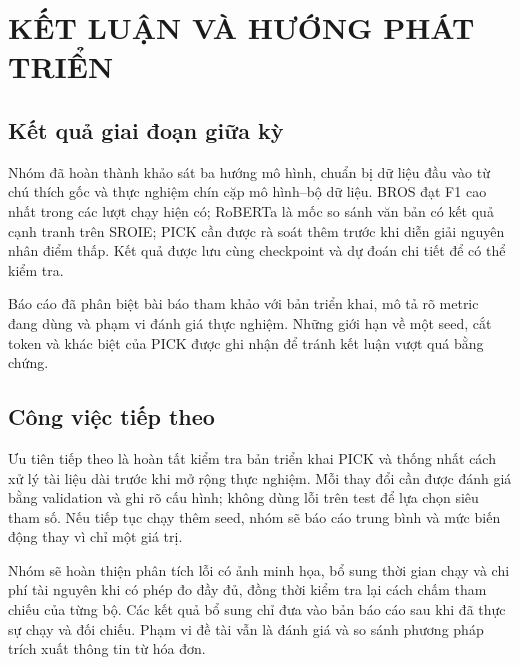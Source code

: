 \chapter{KẾT LUẬN VÀ HƯỚNG PHÁT TRIỂN}

\section{Kết quả giai đoạn giữa kỳ}

Nhóm đã hoàn thành khảo sát ba hướng mô hình, chuẩn bị dữ liệu đầu vào từ chú thích gốc và thực nghiệm chín cặp mô hình--bộ dữ liệu. BROS đạt F1 cao nhất trong các lượt chạy hiện có; RoBERTa là mốc so sánh văn bản có kết quả cạnh tranh trên SROIE; PICK cần được rà soát thêm trước khi diễn giải nguyên nhân điểm thấp. Kết quả được lưu cùng checkpoint và dự đoán chi tiết để có thể kiểm tra.

Báo cáo đã phân biệt bài báo tham khảo với bản triển khai, mô tả rõ metric đang dùng và phạm vi đánh giá thực nghiệm. Những giới hạn về một seed, cắt token và khác biệt của PICK được ghi nhận để tránh kết luận vượt quá bằng chứng.

\section{Công việc tiếp theo}

Ưu tiên tiếp theo là hoàn tất kiểm tra bản triển khai PICK và thống nhất cách xử lý tài liệu dài trước khi mở rộng thực nghiệm. Mỗi thay đổi cần được đánh giá bằng validation và ghi rõ cấu hình; không dùng lỗi trên test để lựa chọn siêu tham số. Nếu tiếp tục chạy thêm seed, nhóm sẽ báo cáo trung bình và mức biến động thay vì chỉ một giá trị.

Nhóm sẽ hoàn thiện phân tích lỗi có ảnh minh họa, bổ sung thời gian chạy và chi phí tài nguyên khi có phép đo đầy đủ, đồng thời kiểm tra lại cách chấm tham chiếu của từng bộ. Các kết quả bổ sung chỉ đưa vào bản báo cáo sau khi đã thực sự chạy và đối chiếu. Phạm vi đề tài vẫn là đánh giá và so sánh phương pháp trích xuất thông tin từ hóa đơn.
